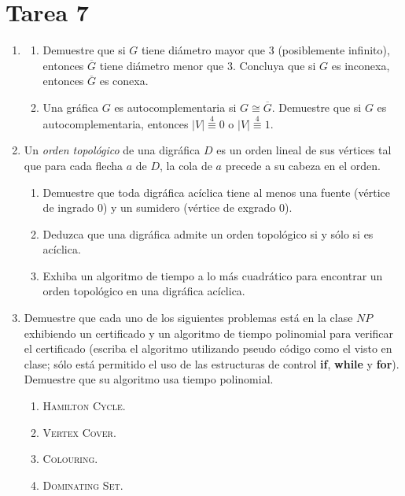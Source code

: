 \documentclass{article}
\begin{document}
\section*{\LARGE{Tarea 7}}
\begin{enumerate}
\item \begin{enumerate}
\item Demuestre que si $G$ tiene di\'ametro mayor que $3$ (posiblemente
  infinito), entonces $\overline{G}$ tiene di\'ametro menor que $3$.
  Concluya que si $G$ es inconexa, entonces $\overline{G}$ es conexa.

\item Una gr\'afica $G$ es autocomplementaria si $G \cong \overline{G}$.
  Demuestre que si $G$ es autocomplementaria, entonces $|V|
  \stackrel{4}{\equiv} 0$ o $|V| \stackrel{4}{\equiv} 1$.
\end{enumerate}

\item Un {\em orden topol\'ogico} de una digr\'afica $D$ es un orden lineal de
  sus v\'ertices tal que para cada flecha $a$ de $D$, la cola de $a$ precede a
  su cabeza en el orden.
  \begin{enumerate}
  \item Demuestre que toda digr\'afica ac\'iclica tiene al menos una fuente
    (v\'ertice de ingrado $0$) y un sumidero (v\'ertice de exgrado $0$).

  \item Deduzca que una digr\'afica admite un orden topol\'ogico si y s\'olo
    si es ac\'iclica.

  \item Exhiba un algoritmo de tiempo a lo m\'as cuadr\'atico para encontrar
    un orden topol\'ogico en una digr\'afica ac\'iclica.
  \end{enumerate}

\item Demuestre que cada uno de los siguientes problemas est\'a en la clase
  $NP$ exhibiendo un certificado y un algoritmo de tiempo polinomial para
  verificar el certificado (escriba el algoritmo utilizando pseudo c\'odigo
  como el visto en clase; s\'olo est\'a permitido el uso de las estructuras de
  control {\bf if}, {\bf while} y {\bf for}).   Demuestre que su algoritmo
  usa tiempo polinomial.
  \begin{enumerate}
  \item \textsc{Hamilton Cycle}.

  \item \textsc{Vertex Cover}.

  \item \textsc{Colouring}.

  \item \textsc{Dominating Set}.
  \end{enumerate}
\end{enumerate}
\end{document}
